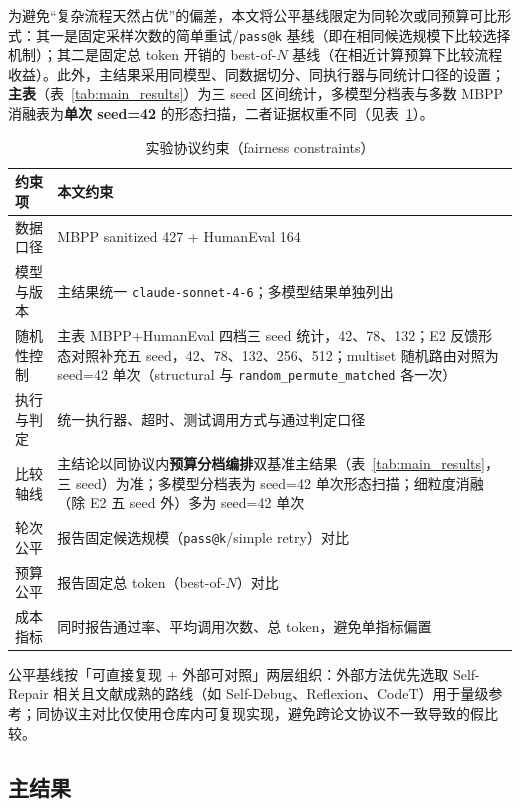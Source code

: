 为避免“复杂流程天然占优”的偏差，本文将公平基线限定为同轮次或同预算可比形式：其一是固定采样次数的简单重试/\texttt{pass@k} 基线（即在相同候选规模下比较选择机制）\cite{chen2021evaluating}；其二是固定总 token 开销的 best-of-$N$ 基线（在相近计算预算下比较流程收益）\cite{li2025sstar}。此外，主结果采用同模型、同数据切分、同执行器与同统计口径的设置；\textbf{主表}（表~\ref{tab:main_results}）为三 seed 区间统计，多模型分档表与多数 MBPP 消融表为\textbf{单次 seed=42} 的形态扫描，二者证据权重不同（见表~\ref{tab:protocol_constraints}）。

\begin{table}[htbp]
\centering
\small
\caption{实验协议约束（fairness constraints）}
\label{tab:protocol_constraints}
\begin{tabularx}{\textwidth}{p{2.8cm} X}
\toprule
约束项 & 本文约束 \\
\midrule
数据口径 & MBPP sanitized 427 + HumanEval 164 \\
模型与版本 & 主结果统一 \texttt{claude-sonnet-4-6}；多模型结果单独列出 \\
随机性控制 & 主表 MBPP+HumanEval 四档三 seed 统计，42、78、132；E2 反馈形态对照补充五 seed，42、78、132、256、512；multiset 随机路由对照为 seed=42 单次（structural 与 \texttt{random\_permute\_matched} 各一次） \\
执行与判定 & 统一执行器、超时、测试调用方式与通过判定口径 \\
比较轴线 & 主结论以同协议内\textbf{预算分档编排}双基准主结果（表~\ref{tab:main_results}，三 seed）为准；多模型分档表为 seed=42 单次形态扫描；细粒度消融（除 E2 五 seed 外）多为 seed=42 单次 \\
轮次公平 & 报告固定候选规模（\texttt{pass@k}/simple retry）对比 \\
预算公平 & 报告固定总 token（best-of-$N$）对比 \\
成本指标 & 同时报告通过率、平均调用次数、总 token，避免单指标偏置 \\
\bottomrule
\end{tabularx}
\end{table}

公平基线按「可直接复现 + 外部可对照」两层组织：外部方法优先选取 Self-Repair 相关且文献成熟的路线（如 Self-Debug、Reflexion、CodeT）用于量级参考；同协议主对比仅使用仓库内可复现实现，避免跨论文协议不一致导致的假比较。

\subsection{主结果}

